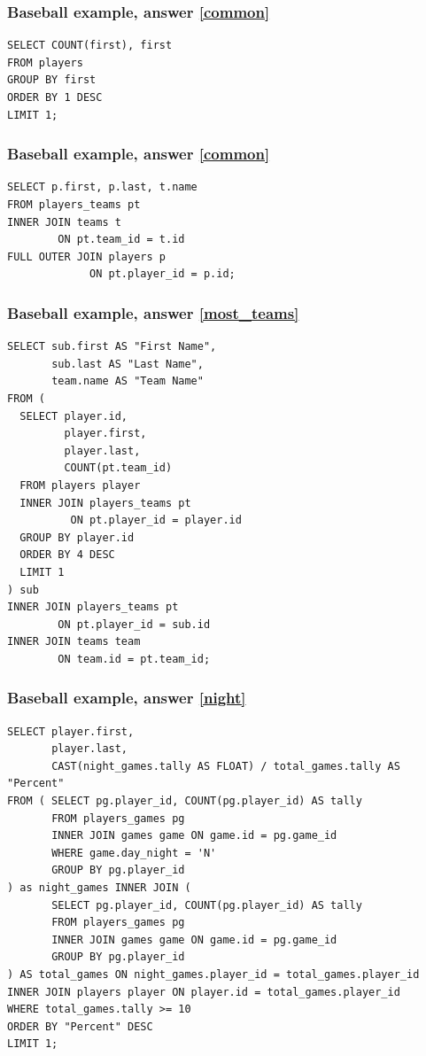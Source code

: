 \documentclass[aspectratio=169]{beamer}
\begin{document}
\begin{frame}[fragile]
  \frametitle{Baseball example, answer \ref{common}}
  \begin{lstlisting}
SELECT COUNT(first), first
FROM players
GROUP BY first
ORDER BY 1 DESC
LIMIT 1;
  \end{lstlisting}
\end{frame}

\begin{frame}[fragile]
  \frametitle{Baseball example, answer \ref{common}}
  \begin{lstlisting}
SELECT p.first, p.last, t.name
FROM players_teams pt
INNER JOIN teams t
        ON pt.team_id = t.id
FULL OUTER JOIN players p
             ON pt.player_id = p.id;
  \end{lstlisting}
\end{frame}

\begin{frame}[fragile]
  \frametitle{Baseball example, answer \ref{most_teams}}
  \begin{lstlisting}
SELECT sub.first AS "First Name",
       sub.last AS "Last Name",
       team.name AS "Team Name"
FROM (
  SELECT player.id,
         player.first,
         player.last,
         COUNT(pt.team_id)
  FROM players player
  INNER JOIN players_teams pt
          ON pt.player_id = player.id
  GROUP BY player.id
  ORDER BY 4 DESC
  LIMIT 1
) sub
INNER JOIN players_teams pt
        ON pt.player_id = sub.id
INNER JOIN teams team
        ON team.id = pt.team_id;
  \end{lstlisting}
\end{frame}

\begin{frame}[fragile]
  \frametitle{Baseball example, answer \ref{night}}
  \begin{lstlisting}
SELECT player.first,
       player.last,
       CAST(night_games.tally AS FLOAT) / total_games.tally AS "Percent"
FROM ( SELECT pg.player_id, COUNT(pg.player_id) AS tally
       FROM players_games pg
       INNER JOIN games game ON game.id = pg.game_id
       WHERE game.day_night = 'N'
       GROUP BY pg.player_id
) as night_games INNER JOIN (
       SELECT pg.player_id, COUNT(pg.player_id) AS tally
       FROM players_games pg
       INNER JOIN games game ON game.id = pg.game_id
       GROUP BY pg.player_id
) AS total_games ON night_games.player_id = total_games.player_id
INNER JOIN players player ON player.id = total_games.player_id
WHERE total_games.tally >= 10
ORDER BY "Percent" DESC
LIMIT 1;
  \end{lstlisting}
\end{frame}
\end{document}
